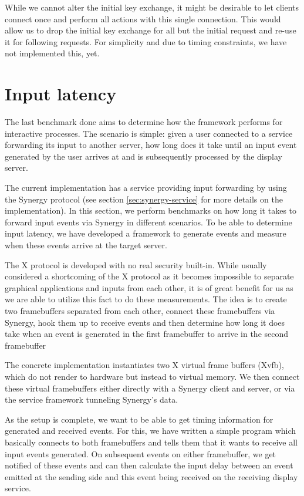 While we cannot alter the initial key exchange, it might be desirable to let clients connect once and perform all actions with this single connection.
This would allow us to drop the initial key exchange for all but the initial request and re-use it for following requests.
For simplicity and due to timing constraints, we have not implemented this, yet.

\section{Input latency}

The last benchmark done aims to determine how the framework performs for interactive processes.
The scenario is simple: given a user connected to a service forwarding its input to another server, how long does it take until an input event generated by the user arrives at and is subsequently processed by the display server.

The current implementation has a service providing input forwarding by using the Synergy protocol (see section \ref{sec:synergy-service} for more details on the implementation).
In this section, we perform benchmarks on how long it takes to forward input events via Synergy in different scenarios.
To be able to determine input latency, we have developed a framework to generate events and measure when these events arrive at the target server.

The X protocol is developed with no real security built-in.
While usually considered a shortcoming of the X protocol as it becomes impossible to separate graphical applications and inputs from each other, it is of great benefit for us as we are able to utilize this fact to do these measurements.
The idea is to create two framebuffers separated from each other, connect these framebuffers via Synergy, hook them up to receive events and then determine how long it does take when an event is generated in the first framebuffer to arrive in the second framebuffer

The concrete implementation instantiates two X virtual frame buffers (Xvfb), which do not render to hardware but instead to virtual memory.
We then connect these virtual framebuffers either directly with a Synergy client and server, or via the service framework tunneling Synergy's data.

As the setup is complete, we want to be able to get timing information for generated and received events.
For this, we have written a simple program which basically connects to both framebuffers and tells them that it wants to receive all input events generated.
On subsequent events on either framebuffer, we get notified of these events and can then calculate the input delay between an event emitted at the sending side and this event being received on the receiving display service.

